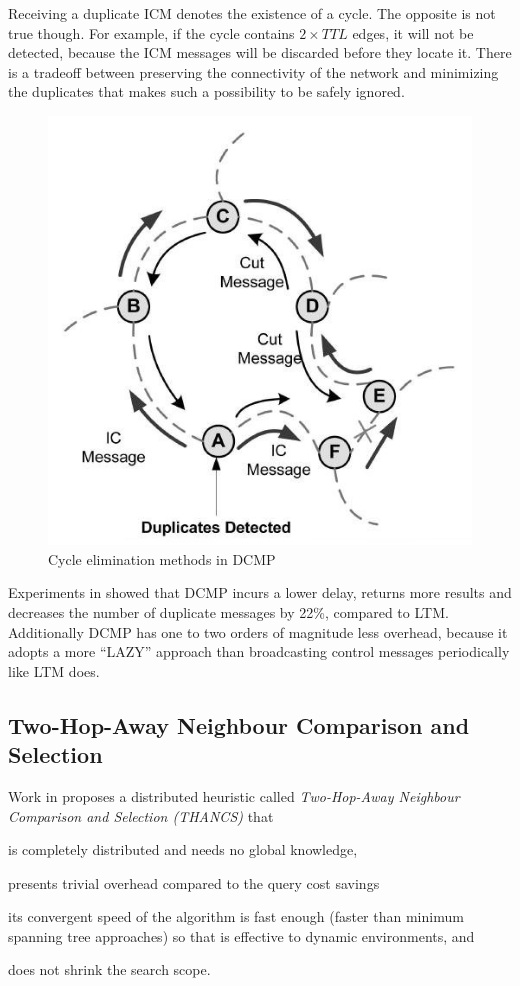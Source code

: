 \documentclass[a4paper,10pt]{article}
\begin{document}
Receiving a duplicate ICM denotes the existence of a cycle. The opposite is not true though. For example, if the cycle contains $2 \times TTL$ edges, it will not be detected, because the ICM messages will be discarded before they locate it. There is a tradeoff between preserving the connectivity of the network and minimizing the duplicates that makes such a possibility to be safely ignored.

\begin{figure}
\centering
  \includegraphics[scale=0.4]{img/dcmp.jpeg}
\caption{Cycle elimination methods in DCMP}
\label{figure:dcmp}
\end{figure}

Experiments in \cite{zhu_dcmp_2008} showed that DCMP incurs a lower delay, returns more results and decreases the number of duplicate messages by 22\%, compared to LTM. Additionally DCMP has one to two orders of magnitude less overhead, because it adopts a more ``LAZY'' approach than broadcasting control messages periodically like LTM does.

\subsection{Two-Hop-Away Neighbour Comparison and Selection}
Work in \cite{liu_thancs_2005, liu_thancs_2008} proposes a distributed heuristic called \emph{Two-Hop-Away Neighbour Comparison and Selection (THANCS)} that
\begin{inparaenum}
  \item is completely distributed and needs no global knowledge,
  \item presents trivial overhead compared to the query cost savings
  \item its convergent speed of the algorithm is fast enough (faster than minimum spanning tree approaches) so that is effective to dynamic environments, and
  \item does not shrink the search scope.
\end{inparaenum}
\end{document}
